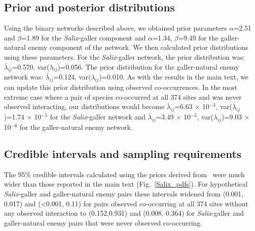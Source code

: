 \documentclass[12pt]{article}
\begin{document}

      \clearpage


    \subsection*{Prior and posterior distributions}

      Using the binary networks described above, we obtained prior parameters $\alpha$=2.51 and $\beta$=1.89 for the \emph{Salix}-galler component and $\alpha$=1.34, $\beta$=9.49 for the galler-natural enemy component of the network. We then calculated prior distributions using these parameters. For the \emph{Salix}-galler network, the prior distribution was: $\bar\lambda_{ij}$=0.570, var($\lambda_{ij}$)=0.056. The prior distribution for the galler-natural enemy network was: $\bar\lambda_{ij}$=0.124, var($\lambda_{ij}$)=0.010. As with the results in the main text, we can update this prior distribution using observed co-occurrences. In the most extreme case where a pair of species co-occurred at all 374 sites and was never observed interacting, our distributions would become 
      $\bar\lambda_{ij}$=6.63 $\times$ 10$^{-3}$, var($\lambda_{ij}$)=1.74 $\times$ 10$^{-5}$ for the \emph{Salix}-galler network and 
      $\bar\lambda_{ij}$=3.49 $\times$ 10$^{-3}$, var($\lambda_{ij}$)=9.03 $\times$ 10$^{-6}$ for the galler-natural enemy network. 

    \subsection*{Credible intervals and sampling requirements}

      The 95\% credible intervals calculated using the priors derived from~\citet{Barbour2016} were much wider than those reported in the main text (Fig.~\ref{Salix_pdfs}). For hypothetical \emph{Salix}-galler and galler-natural enemy pairs these intervals widened from (0.001, 0.017) and (\textless0.001, 0.11) for pairs observed co-occurring at all 374 sites without any observed interaction to (0.152,0.931) and (0.008, 0.364) for \emph{Salix}-galler and galler-natural enemy pairs that were never observed co-occurring.
\end{document}
